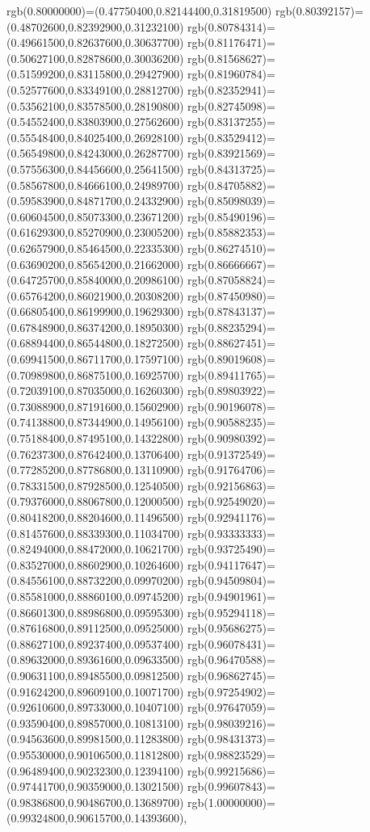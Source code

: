 {{rgb(0.80000000)=(0.47750400,0.82144400,0.31819500)
rgb(0.80392157)=(0.48702600,0.82392900,0.31232100)
rgb(0.80784314)=(0.49661500,0.82637600,0.30637700)
rgb(0.81176471)=(0.50627100,0.82878600,0.30036200)
rgb(0.81568627)=(0.51599200,0.83115800,0.29427900)
rgb(0.81960784)=(0.52577600,0.83349100,0.28812700)
rgb(0.82352941)=(0.53562100,0.83578500,0.28190800)
rgb(0.82745098)=(0.54552400,0.83803900,0.27562600)
rgb(0.83137255)=(0.55548400,0.84025400,0.26928100)
rgb(0.83529412)=(0.56549800,0.84243000,0.26287700)
rgb(0.83921569)=(0.57556300,0.84456600,0.25641500)
rgb(0.84313725)=(0.58567800,0.84666100,0.24989700)
rgb(0.84705882)=(0.59583900,0.84871700,0.24332900)
rgb(0.85098039)=(0.60604500,0.85073300,0.23671200)
rgb(0.85490196)=(0.61629300,0.85270900,0.23005200)
rgb(0.85882353)=(0.62657900,0.85464500,0.22335300)
rgb(0.86274510)=(0.63690200,0.85654200,0.21662000)
rgb(0.86666667)=(0.64725700,0.85840000,0.20986100)
rgb(0.87058824)=(0.65764200,0.86021900,0.20308200)
rgb(0.87450980)=(0.66805400,0.86199900,0.19629300)
rgb(0.87843137)=(0.67848900,0.86374200,0.18950300)
rgb(0.88235294)=(0.68894400,0.86544800,0.18272500)
rgb(0.88627451)=(0.69941500,0.86711700,0.17597100)
rgb(0.89019608)=(0.70989800,0.86875100,0.16925700)
rgb(0.89411765)=(0.72039100,0.87035000,0.16260300)
rgb(0.89803922)=(0.73088900,0.87191600,0.15602900)
rgb(0.90196078)=(0.74138800,0.87344900,0.14956100)
rgb(0.90588235)=(0.75188400,0.87495100,0.14322800)
rgb(0.90980392)=(0.76237300,0.87642400,0.13706400)
rgb(0.91372549)=(0.77285200,0.87786800,0.13110900)
rgb(0.91764706)=(0.78331500,0.87928500,0.12540500)
rgb(0.92156863)=(0.79376000,0.88067800,0.12000500)
rgb(0.92549020)=(0.80418200,0.88204600,0.11496500)
rgb(0.92941176)=(0.81457600,0.88339300,0.11034700)
rgb(0.93333333)=(0.82494000,0.88472000,0.10621700)
rgb(0.93725490)=(0.83527000,0.88602900,0.10264600)
rgb(0.94117647)=(0.84556100,0.88732200,0.09970200)
rgb(0.94509804)=(0.85581000,0.88860100,0.09745200)
rgb(0.94901961)=(0.86601300,0.88986800,0.09595300)
rgb(0.95294118)=(0.87616800,0.89112500,0.09525000)
rgb(0.95686275)=(0.88627100,0.89237400,0.09537400)
rgb(0.96078431)=(0.89632000,0.89361600,0.09633500)
rgb(0.96470588)=(0.90631100,0.89485500,0.09812500)
rgb(0.96862745)=(0.91624200,0.89609100,0.10071700)
rgb(0.97254902)=(0.92610600,0.89733000,0.10407100)
rgb(0.97647059)=(0.93590400,0.89857000,0.10813100)
rgb(0.98039216)=(0.94563600,0.89981500,0.11283800)
rgb(0.98431373)=(0.95530000,0.90106500,0.11812800)
rgb(0.98823529)=(0.96489400,0.90232300,0.12394100)
rgb(0.99215686)=(0.97441700,0.90359000,0.13021500)
rgb(0.99607843)=(0.98386800,0.90486700,0.13689700)
rgb(1.00000000)=(0.99324800,0.90615700,0.14393600)},
}